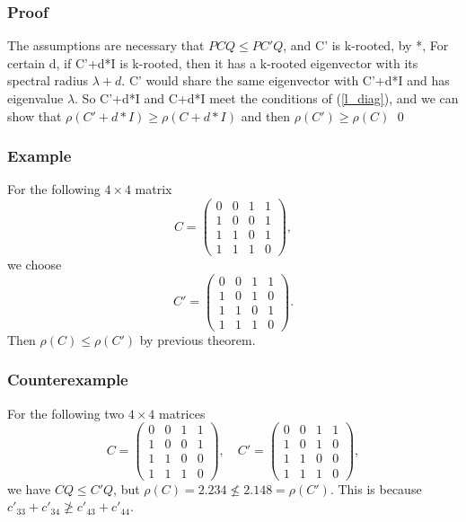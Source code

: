 \documentclass[]{beamer}
\theoremstyle{plain}
\theoremstyle{definition}
\begin{document}
\begin{frame}
    \frametitle{ Proof}

The assumptions are necessary that $PCQ \leq PC'Q$, and C' is k-rooted, by *, For certain d, if C'+d*I is k-rooted, then it has a k-rooted eigenvector with its spectral radius $\lambda + d$. C' would share the same eigenvector with C'+d*I and has eigenvalue $\lambda$. So C'+d*I and C+d*I meet the conditions of (\ref{l_diag}), and we can show that $\rho(C' + d*I) \geq \rho(C +d*I)$ and then $\rho(C') \geq \rho(C)$  \qed    

\end{frame}

\begin{frame}
    \frametitle{ Example}
    For the following $4\times 4$ matrix
    $$C=\begin{pmatrix}
    0 & 0 & 1 & 1\\
    1 & 0 & 0 & 1\\
    1 & 1 & 0 & 1\\
    1 & 1 & 1 & 0
    \end{pmatrix},$$
    we choose
    $$C'=\begin{pmatrix}
    0 & 0 & 1 & 1\\
    1 & 0 & 1 &  0\\
    1 & 1 & 0 & 1\\
    1 & 1 & 1 & 0
    \end{pmatrix}.$$
    Then
    $\rho(C)\leq \rho(C')$ by previous theorem.
\end{frame}

\begin{frame}
    \frametitle{Counterexample}
    For the following two $4\times 4$ matrices
    $$C=\begin{pmatrix}
    0 & 0 & 1 & 1\\
    1 & 0 & 0 & 1\\
    1 & 1 & 0 & 0\\
    1 & 1 & 1 & 0
    \end{pmatrix},\quad C'=\begin{pmatrix}
    0 & 0 & 1 & 1\\
    1 & 0 & 1 &  0\\
    1 & 1 & 0 & 0\\
    1 & 1 & 1 & 0
    \end{pmatrix},$$ 
    we have $CQ\leq C'Q$, but 
    $\rho(C)=2.234\not\leq 2.148= \rho(C')$. 
    This is because $c'_{33}+c'_{34}\not\geq c'_{43}+c'_{44}$. 
\end{frame}
\end{document}
